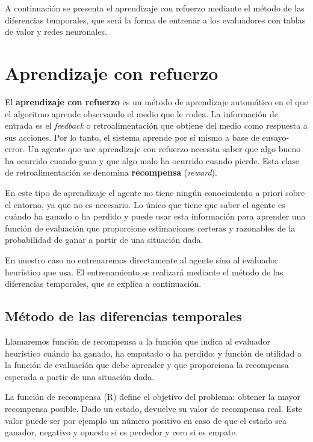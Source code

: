 \bigskip
A continuación se presenta el aprendizaje con refuerzo mediante el método de las diferencias temporales, que será la forma de entrenar a los evaluadores con tablas de valor y redes neuronales.

\section{Aprendizaje con refuerzo}
\label{sec:aprendizaje_refuerzo}
El \textbf{aprendizaje con refuerzo} es un método de aprendizaje automático en el que el algoritmo aprende observando el medio que le rodea.
La información de entrada es el \textit{feedback} o retroalimentación que obtiene del medio como respuesta a sus acciones.
Por lo tanto, el sistema aprende por sí mismo a base de ensayo-error.
Un agente que use aprendizaje con refuerzo necesita saber que algo bueno ha ocurrido cuando gana y que algo malo ha ocurrido cuando pierde.
Esta clase de retroalimentación se denomina \textbf{recompensa} (\textit{reward}).

En este tipo de aprendizaje el agente no tiene ningún conocimiento a priori sobre el entorno, ya que no es necesario.
Lo único que tiene que saber el agente es cuándo ha ganado o ha perdido y puede usar esta información para aprender una función de evaluación que proporcione estimaciones certeras y razonables de la probabilidad de ganar a partir de una situación dada.

En nuestro caso no entrenaremos directamente al agente sino al evaluador heurístico que usa.
El entrenamiento se realizará mediante el método de las diferencias temporales, que se explica a continuación.

\subsection{Método de las diferencias temporales}
\label{ssec:diferencias_temporales}
Llamaremos función de recompensa a la función que indica al evaluador heurístico cuándo ha ganado, ha empatado o ha perdido; y función de utilidad a la función de evaluación que debe aprender y que proporciona la recompensa esperada a partir de una situación dada.

La función de recompensa (R) define el objetivo del problema: obtener la mayor recompensa posible.
Dado un estado, devuelve su valor de recompensa real.
Este valor puede ser por ejemplo un número positivo en caso de que el estado sea ganador, negativo y opuesto si es perdedor y cero si es empate.

